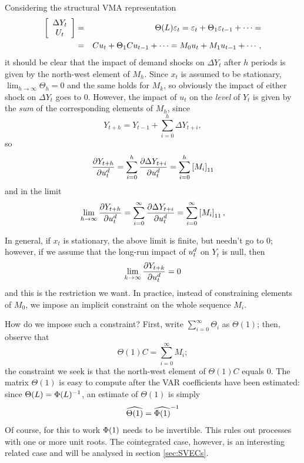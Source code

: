 \documentclass[a4paper,10pt]{article}
\newcommand{\PrE}[1]{\ensuremath \varepsilon_{#1}}
\newcommand{\StS}[1]{\ensuremath u_{#1}}
\newcommand{\VarSym}{\ensuremath \Phi}
\newcommand{\pder}[2]{\ensuremath\frac{\partial #1}{\partial #2}}
\begin{document}
Considering the structural VMA representation
\begin{eqnarray*}
  \left[ \begin{array}{c} \Delta Y_t \\ U_t \end{array}\right] & = & 
  \Theta(L) \PrE{t} =
  \PrE{t} + \Theta_1 \PrE{t-1}  + \cdots = \\
  & = & C \StS{t} + \Theta_1 C \StS{t-1}  + \cdots =
  M_0 \StS{t} + M_1 \StS{t-1}  + \cdots ,
\end{eqnarray*}
it should be clear that the impact of demand shocks on $\Delta Y_t$
after $h$ periods is given by the north-west element of $M_h$. Since
$x_t$ is assumed to be stationary, $\lim_{h \to \infty} \Theta_h = 0$
and the same holds for $M_k$, so obviously the impact of either shock
on $\Delta Y_t$ goes to 0. However, the impact of $u_t$ on the
\emph{level} of $Y_t$ is given by the \emph{sum} of the corresponding
elements of $M_h$, since
\[
Y_{t+h} = Y_{t-1} + \sum_{i=0}^h \Delta Y_{t+i}, 
\]
so 
\[
  \pder{Y_{t+h}}{\StS{t}^d} = 
  \sum_{i=0}^h \pder{\Delta Y_{t+i}}{\StS{t}^d} = 
  \sum_{i=0}^h \left[M_i\right]_{11}
\]
and in the limit
\[
\lim_{h \to \infty} \pder{Y_{t+h}}{\StS{t}^d} = \sum_{i=0}^{\infty}
\pder{\Delta Y_{t+i}}{\StS{t}^d}  = 
  \sum_{i=0}^{\infty} \left[M_i\right]_{11},
\]

In general, if $x_t$ is stationary, the above limit is finite, but
needn't go to 0; however, if we assume that the long-run impact of
$\StS{t}^d$ on $Y_t$ is null, then
\[
  \lim_{k \to \infty} \pder{Y_{t+k}}{\StS{t}^d} = 0
\]
and this is the restriction we want. In practice, instead of
constraining elements of $M_0$, we impose an implicit constraint on
the whole sequence $M_i$.

How do we impose such a constraint?  First, write $\sum_{i=0}^{\infty}
\Theta_i$ as $\Theta(1)$; then, observe that
\[
  \Theta(1) C = \sum_{i=0}^{\infty} M_i ;
\]
the constraint we seek is that the north-west element of $\Theta(1) C$
equals 0. The matrix $\Theta(1)$ is easy to compute after the VAR
coefficients have been estimated: since $\Theta(L) = \VarSym(L)^{-1}$, an
estimate of $\Theta(1)$ is simply
\[
  \widehat{\Theta(1)} = \widehat{\VarSym(1)}^{-1}
\]
Of course, for this to work $\VarSym(1)$ needs to be invertible. This rules
out processes with one or more unit roots. The cointegrated case,
however, is an interesting related case and will be analysed in section
\ref{sec:SVECs}.
\end{document}
